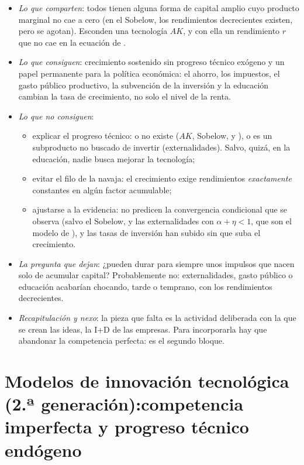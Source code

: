 \documentclass[11pt]{article}
\begin{document}
\begin{itemize}
\item \emph{Lo que comparten}: todos tienen alguna forma de capital amplio cuyo producto marginal no cae a cero (en el Sobelow, los rendimientos decrecientes existen, pero se agotan). Esconden una tecnología $AK$, y con ella un rendimiento $r$ que no cae en la ecuación de .
\item \emph{Lo que consiguen}: crecimiento sostenido sin progreso técnico exógeno y un papel permanente para la política económica: el ahorro, los impuestos, el gasto público productivo, la subvención de la inversión y la educación cambian la tasa de crecimiento, no solo el nivel de la renta.
\item \emph{Lo que no consiguen}:
  \begin{itemize}
  \item explicar el progreso técnico: o no existe ($AK$, Sobelow,  y ), o es un subproducto no buscado de invertir (externalidades). Salvo, quizá, en la educación, nadie busca mejorar la tecnología;
  \item evitar el filo de la navaja: el crecimiento exige rendimientos \emph{exactamente} constantes en algún factor acumulable;
  \item ajustarse a la evidencia: no predicen la convergencia condicional que se observa (salvo el Sobelow, y las externalidades con $\alpha+\eta<1$, que son el modelo de ), y las tasas de inversión han subido sin que suba el crecimiento\nocite{Jones1995QJE}.
  \end{itemize}
\item \emph{La pregunta que dejan}: ¿pueden durar para siempre unos impulsos que nacen solo de acumular capital? Probablemente no: externalidades, gasto público o educación acabarían chocando, tarde o temprano, con los rendimientos decrecientes.
\item \emph{Recapitulación y nexo}: la pieza que falta es la actividad deliberada con la que se crean las ideas, la I+D de las empresas. Para incorporarla hay que abandonar la competencia perfecta: es el segundo bloque.
\end{itemize}

\section{Modelos de innovación tecnológica (2.ª generación):\newline competencia imperfecta y progreso técnico endógeno}\label{sec:segunda-generacion}
\end{document}
